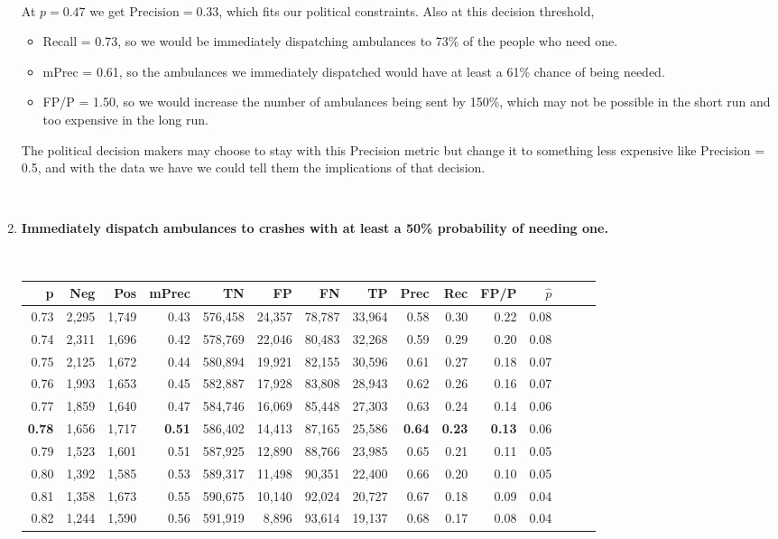 \begin{enumerate}
\
	
	At $p=0.47$ we get $\text{Precision} = 0.33$, which fits our political constraints.  Also at this decision threshold,  
	
\begin{itemize}
	\item Recall = 0.73, so we would be immediately dispatching ambulances to 73\% of the people who need one.  
	\item mPrec = 0.61, so the ambulances we immediately dispatched would have at least a 61\% chance of being needed.  
	\item FP/P = 1.50, so we would increase the number of ambulances being sent by 150\%, which may not be possible in the short run and too expensive in the long run.  
\end{itemize}

The political decision makers may choose to stay with this Precision metric but change it to something less expensive like Precision = 0.5, and with the data we have we could tell them the implications of that decision.  
	
	
	\
	
	\item {\bf Immediately dispatch ambulances to crashes with at least a 50\% probability of needing one.}  
	
	\
	
\begin{tabular}{rrrrrrrrrrrrrrr}
\toprule
p &     Neg &    Pos & mPrec &       TN &       FP &       FN &       TP &  Prec &   Rec &  FP/P & $\hat{p}$ \\
\midrule
0.73 &   2,295 &  1,749 &  0.43 &  576,458 &   24,357 &   78,787 &   33,964 &  0.58 &  0.30 &  0.22 &      0.08 \\
0.74 &   2,311 &  1,696 &  0.42 &  578,769 &   22,046 &   80,483 &   32,268 &  0.59 &  0.29 &  0.20 &      0.08 \\
0.75 &   2,125 &  1,672 &  0.44 &  580,894 &   19,921 &   82,155 &   30,596 &  0.61 &  0.27 &  0.18 &      0.07 \\
0.76 &   1,993 &  1,653 &  0.45 &  582,887 &   17,928 &   83,808 &   28,943 &  0.62 &  0.26 &  0.16 &      0.07 \\
0.77 &   1,859 &  1,640 &  0.47 &  584,746 &   16,069 &   85,448 &   27,303 &  0.63 &  0.24 &  0.14 &      0.06 \\
\bf 0.78 &   1,656 &  1,717 & \bf  0.51 &  586,402 &   14,413 &   87,165 &   25,586 & \bf 0.64 & \bf  0.23 & \bf 0.13 &      0.06 \\
0.79 &   1,523 &  1,601 &  0.51 &  587,925 &   12,890 &   88,766 &   23,985 &  0.65 &  0.21 &  0.11 &      0.05 \\
0.80 &   1,392 &  1,585 &  0.53 &  589,317 &   11,498 &   90,351 &   22,400 &  0.66 &  0.20 &  0.10 &      0.05 \\
0.81 &   1,358 &  1,673 &  0.55 &  590,675 &   10,140 &   92,024 &   20,727 &  0.67 &  0.18 &  0.09 &      0.04 \\
0.82 &   1,244 &  1,590 &  0.56 &  591,919 &    8,896 &   93,614 &   19,137 &  0.68 &  0.17 &  0.08 &      0.04 \\
\bottomrule
\end{tabular}
	

\end{enumerate}
